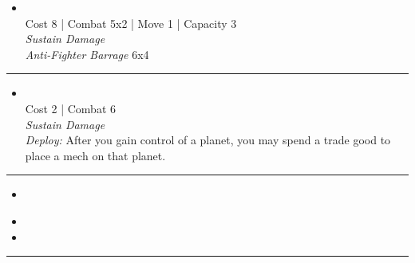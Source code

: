 \begin{multicols}{2}

\begin{itemize}
\item {}\\
Cost 8 | Combat 5x2 | Move 1 | Capacity 3 \\
\emph{Sustain Damage}\\
\emph{Anti-Fighter Barrage} 6x4
\end{itemize}

\vspace{-10pt}\rule{\hsize}{0.4pt}\vspace{5pt}


\begin{itemize}
\item {}
\\
Cost 2 | Combat 6 \\
\emph{Sustain Damage}\\
\emph{Deploy:} After you gain control of a planet, you may spend a trade good to place a mech on that planet.
\end{itemize}

\vspace{-10pt}\rule{\hsize}{0.4pt}\vspace{5pt}


\begin{itemize}
\item \factoryI
\end{itemize}

\columnbreak
{}

\begin{itemize}
\item \factoryII
\item \chaosMapping
\end{itemize}

\vspace{-10pt}\rule{\hsize}{0.4pt}\vspace{5pt}



\end{multicols}
